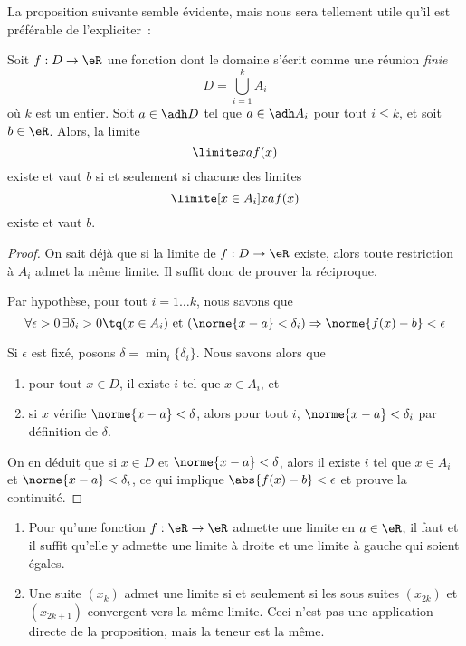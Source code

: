 La proposition suivante semble évidente, mais nous sera tellement
utile qu'il est préférable de l'expliciter~:
\begin{proposition}
Soit $f : D \to \eR$ une fonction dont le domaine
  s'écrit comme une réunion \emph{finie}
  \begin{equation*}
    D = \bigcup_{i=1}^k A_i
  \end{equation*}  
  où $k$ est un entier. Soit $a \in \adh D$ tel que $a \in \adh A_i$
  pour tout $i \leq k$, et soit $b \in \eR$. Alors, la limite
  \begin{equation*}
    \limite x a f(x)
  \end{equation*}
  existe et vaut $b$ si et seulement si chacune des limites
  \begin{equation*}
    \limite[x \in A_i] x a f(x)
  \end{equation*}
  existe et vaut $b$.
\end{proposition}

\begin{proof}On sait déjà que si la limite de $f : D \to \eR$
  existe, alors toute restriction à $A_i$ admet la même limite. Il
  suffit donc de prouver la réciproque.

  Par hypothèse, pour tout $i = 1 \ldots k$, nous savons que
  \begin{equation*}
    \forall \epsilon > 0\, \exists \delta_i > 0 \tq (x \in A_i)
    \text{ et }
    (\norme{x-a} < \delta_i) \Rightarrow \norme{f(x) - b} < \epsilon
  \end{equation*}

  Si $\epsilon$ est fixé, posons $\delta = \min_i\{\delta_i\}$. Nous
  savons alors que
  \begin{enumerate}
  \item pour tout $x \in D$, il existe $i$ tel que $x \in A_i$, et
  \item si $x$ vérifie $\norme{x-a} < \delta$, alors pour tout $i$,
    $\norme{x-a} < \delta_i$ par définition de $\delta$.
  \end{enumerate}
  
  On en déduit que si $x \in D$ et $\norme{x-a} < \delta$, alors il
  existe $i$ tel que $x \in A_i$ et $\norme{x-a} < \delta_i$, ce qui
  implique $\abs{f(x) - b} < \epsilon$ et prouve la continuité.
\end{proof}

\begin{example}
  \begin{enumerate}
  \item Pour qu'une fonction $f : \eR \to \eR$ admette une limite en
    $a \in \eR$, il faut et il suffit qu'elle y admette une limite à
    droite et une limite à gauche qui soient égales.

  \item Une suite $(x_k)$ admet une limite si et seulement si les
    sous suites $(x_{2k})$ et $(x_{2k+1})$ convergent vers la même
    limite. Ceci n'est pas une application directe de la proposition,
    mais la teneur est la même.
  \end{enumerate}
\end{example}

